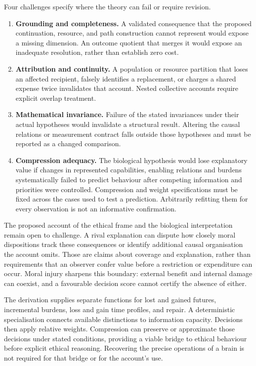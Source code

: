 \documentclass[11pt,a4paper]{article}
\theoremstyle{remark}
\begin{document}
Four challenges specify where the theory can fail or require revision.
\begin{enumerate}[leftmargin=*]
\item \textbf{Grounding and completeness.} A validated consequence that the
proposed continuation, resource, and path construction cannot represent would
expose a missing dimension. An outcome quotient that merges it would expose an
inadequate resolution, rather than establish zero cost.
\item \textbf{Attribution and continuity.} A population or resource partition
that loses an affected recipient, falsely identifies a replacement, or charges
a shared expense twice invalidates that account. Nested collective accounts
require explicit overlap treatment.
\item \textbf{Mathematical invariance.} Failure of the stated invariances under
their actual hypotheses would invalidate a structural result. Altering the
causal relations or measurement contract falls outside those hypotheses and
must be reported as a changed comparison.
\item \textbf{Compression adequacy.} The biological hypothesis would lose
explanatory value if changes in represented capabilities, enabling relations
and burdens systematically failed to predict behaviour after competing
information and priorities were controlled. Compression and weight specifications must be fixed across the cases used to
test a prediction. Arbitrarily refitting them for every observation is not an
informative confirmation.
\end{enumerate}

The proposed account of the ethical frame and the biological interpretation
remain open to challenge.
A rival explanation can dispute how closely moral dispositions track these
consequences or identify additional causal organisation the account omits.
Those are claims about coverage and explanation, rather than requirements that
an observer confer value before a restriction or expenditure can occur. Moral
injury sharpens this boundary: external benefit and internal damage can coexist,
and a favourable decision score cannot certify the absence of either.

The derivation supplies separate functions for lost and gained futures,
incremental burdens, loss and gain time profiles, and repair. A deterministic specialisation
connects available distinctions to information capacity. Decisions then apply
relative weights. Compression can preserve or approximate those decisions under
stated conditions, providing a viable bridge to ethical behaviour before explicit
ethical reasoning. Recovering the precise operations of a brain is not required
for that bridge or for the account's use.
\end{document}
